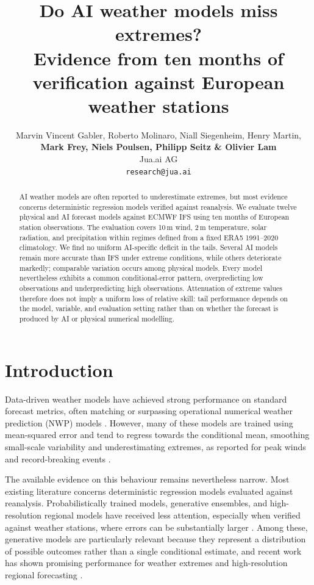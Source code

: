 \documentclass{article}
\title{Do AI weather models miss extremes?\\
Evidence from ten months of verification against European
weather stations}
\author{Marvin Vincent Gabler, Roberto Molinaro, Niall Siegenheim, Henry Martin,\\
\textbf{Mark Frey, Niels Poulsen, Philipp Seitz \& Olivier Lam}\\
Jua.ai AG\\
\texttt{research@jua.ai}
}
\begin{document}
\maketitle
\begin{abstract}
  AI weather models are often reported to underestimate extremes, but most
  evidence concerns deterministic regression models verified against
  reanalysis. We evaluate twelve physical and AI forecast models against
  ECMWF IFS using ten months of European station observations. The
  evaluation covers 10\,m wind, 2\,m temperature, solar radiation, and
  precipitation within regimes defined from a fixed ERA5 1991--2020
  climatology. We find no uniform AI-specific deficit in the tails. Several
  AI models remain more accurate than IFS under extreme conditions, while
  others deteriorate markedly; comparable variation occurs among physical
  models. Every model nevertheless exhibits a common conditional-error
  pattern, overpredicting low observations and underpredicting high
  observations. Attenuation of extreme values therefore does not imply a
  uniform loss of relative skill: tail performance depends on the model,
  variable, and evaluation setting rather than on whether the forecast is
  produced by AI or physical numerical modelling.
  \end{abstract}

\section{Introduction}

Data-driven weather models have achieved strong performance on standard
forecast metrics, often matching or surpassing operational numerical
weather prediction (NWP) models
\citep{bi2023pangu,lam2023graphcast,bouallegue2024rise}. However, many of
these models are trained using mean-squared error and tend to regress
towards the conditional mean, smoothing small-scale variability and
underestimating extremes, as reported for peak winds and record-breaking
events \citep{olivetti2024,bonavita2024limitations,charltonperez2024,
olivetti2024extremes,zhang2026records}.

The available evidence on this behaviour remains nevertheless narrow. Most
existing literature concerns deterministic regression models evaluated
against reanalysis. Probabilistically trained models, generative ensembles,
and high-resolution regional models have received less attention, especially
when verified against weather stations, where errors can be substantially
larger \citep{jin2024weatherreal,gupta2025mausam,wagner2025stationbench}.
Among these, generative models are particularly relevant because they
represent a distribution of possible outcomes rather than a single
conditional estimate, and recent work has shown promising performance for
weather extremes and high-resolution regional forecasting
\citep{price2024gencast,pathak2026stormcast,molinaro2024gencfd}.
\end{document}
